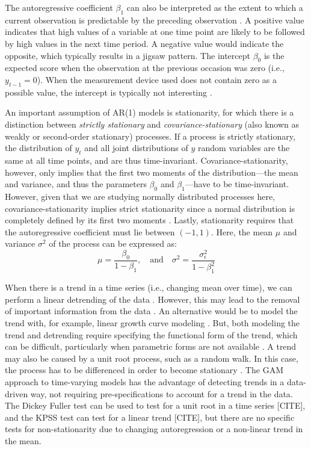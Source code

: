 The autoregressive coefficient $\beta_1$ can also be interpreted as the extent to which a current observation is predictable by the preceding observation \cite{hamaker2009idiographic}. A positive value indicates that high values of a variable at one time point are likely to be followed by high values in the next time period. A negative value would indicate the opposite, which typically results in a jigsaw pattern. The intercept $\beta_0$ is the expected score when the observation at the previous occasion was zero (i.e., $y_{t-1} = 0$). When the measurement device used does not contain zero as a possible value, the intercept is typically not interesting \cite{bringmann2017changing}.

An important assumption of AR(1) models is stationarity, for which there is a distinction between \textit{strictly stationary} and \textit{covariance-stationary} (also known as weakly or second-order stationary) processes. If a process is strictly stationary, the distribution of $y_t$ and all joint distributions of $y$ random variables are the same at all time points, and are thus time-invariant. Covariance-stationarity, however, only implies that the first two moments of the distribution---the mean and variance, and thus the parameters $\beta_0$ and $\beta_1$---have to be time-invariant. However, given that we are studying normally distributed processes here, covariance-stationarity implies strict stationarity since a normal distribution is completely defined by its first two moments \cite[36]{chatfield2003time}. Lastly, stationarity requires that the autoregressive coefficient must lie between $(-1, 1)$. Here, the mean $\mu$ and variance $\sigma^2$ of the process can be expressed as:
\begin{equation}
    \mu = \frac{\beta_0}{1 - \beta_1}, \quad \text{and} \quad \sigma^2 = \frac{\sigma_{\epsilon}^2}{1 - \beta_1^2} 
\end{equation}

When there is a trend in a time series (i.e., changing mean over time), we can perform a linear detrending of the data \cite{hamaker2009idiographic}. However, this may lead to the removal of important information from the data \cite{molenaar1992dynamic}. An alternative would be to model the trend with, for example, linear growth curve modeling \cite{tschacher2009panel}. But, both modeling the trend and detrending require specifying the functional form of the trend, which can be difficult, particularly when parametric forms are not available \cite{tan2012time,adolph2008shape,faraway2006glms}. A trend may also be caused by a unit root process, such as a random walk. In this case, the process has to be differenced in order to become stationary \cite{hamilton1994time}. The GAM approach to time-varying models has the advantage of detecting trends in a data-driven way, not requiring pre-specifications to account for a trend in the data. The Dickey Fuller test can be used to test for a unit root in a time series [CITE], and the KPSS test can test for a linear trend [CITE], but there are no specific tests for non-stationarity due to changing autoregression or a non-linear trend in the mean. 

